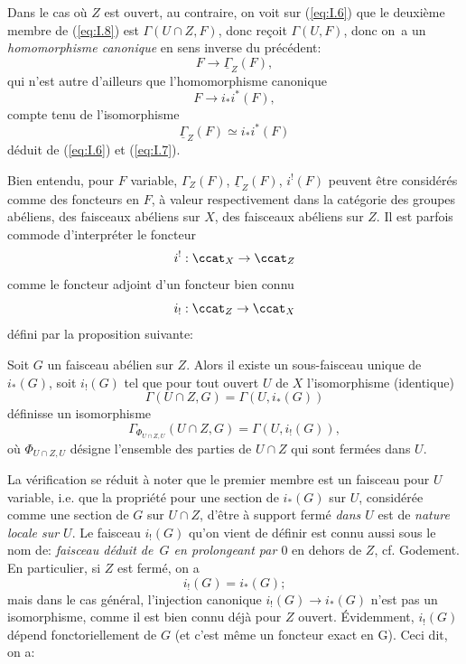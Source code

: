 Dans le cas o\`u $Z$ est ouvert, au contraire, on voit sur
(\ref{eq:I.6}) que le deuxi\`eme membre de (\ref{eq:I.8}) est
$\Gamma(U\cap Z, F)$, donc re\c coit $\Gamma(U, F)$, donc on~a un
\textit{homomorphisme canonique} en sens inverse du pr\'ec\'edent:
\begin{equation*} \label{eq:I.8''} \tag{8} {F\to \underline{\Gamma}_Z(F)},
\end{equation*}
qui n'est autre d'ailleurs que l'homomorphisme canonique
$$F\to i_*i^*(F),
$$
compte tenu de l'isomorphisme
\begin{equation*} \label{eq:I.6bis} \tag{6 bis} {\underline{\Gamma}_Z(F)\simeq i_*i^*(F)}
\end{equation*}
d\'eduit de (\ref{eq:I.6}) et (\ref{eq:I.7}).

Bien entendu, pour $F$ variable, $\Gamma_Z(F)$, $\underline{\Gamma}_Z(F)$, $i^!(F)$ peuvent \^etre consid\'er\'es comme des foncteurs en $F$, \`a valeur respectivement dans la cat\'egorie des groupes ab\'eliens, des faisceaux ab\'eliens sur $X$, des faisceaux ab\'eliens sur $Z$. Il est parfois commode d'interpr\'eter le foncteur
$$i^!: \ccat_X \to \ccat_Z$$
comme le foncteur adjoint d'un foncteur bien connu
$$i_!: \ccat_Z \to \ccat_X$$
d\'efini par la proposition suivante:

\begin{proposition} \label{I.1.2}
Soit $G$ un faisceau ab\'elien sur $Z$. Alors il existe un sous-faisceau unique de $i_*(G)$, soit $i_!(G)$ tel que pour tout ouvert $U$ de $X$ l'isomorphisme (identique)
$$
\Gamma(U\cap Z, G)= \Gamma(U, i_*(G))$$
d\'efinisse un isomorphisme
$$
\Gamma_{\Phi_{U\cap Z, U}}(U\cap Z, G)=\Gamma(U, i_! (G)),
$$
o\`u $\Phi_{U\cap Z, U}$ d\'esigne l'ensemble des parties de $U\cap Z$ qui sont ferm\'ees dans $U$.
\end{proposition}

La v\'erification se r\'eduit \`a noter que le premier membre est un faisceau pour $U$ variable, i.e. que la propri\'et\'e pour une section de $i_*(G)$ sur $U$, consid\'er\'ee comme une section de $G$ sur $U\cap Z$, d'\^etre \`a support ferm\'e \textit{dans $U$} est de \textit{nature locale sur $U$}. Le faisceau $i_!(G)$ qu'on vient de d\'efinir est connu aussi sous le nom de: \textit{faisceau déduit de~$G$ en prolongeant par $0$} en dehors de $Z$, cf. Godement. En particulier, si $Z$ est ferm\'e, on a
\begin{equation} \label{eq:I.9} {i_!(G)=i_*(G)};
\end{equation}
mais dans le cas g\'en\'eral, l'injection canonique $i_!(G) \to i_*(G)$ n'est pas un isomorphisme, comme il est bien connu d\'ej\`a pour $Z$ ouvert. \'Evidemment, $i_!(G)$ d\'epend fonctoriellement de $G$ (et c'est m\^eme un foncteur exact en G). Ceci dit, on a:

